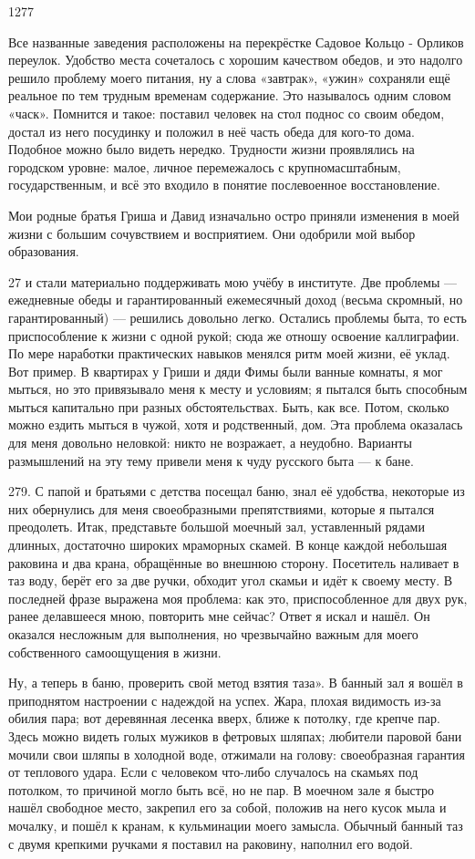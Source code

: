 1277

Все названные заведения расположены на перекрёстке Садовое Кольцо - Орликов переулок. Удобство места сочеталось с хорошим качеством обедов, и это надолго решило проблему моего питания, ну а слова «завтрак», «ужин» сохраняли ещё реальное по тем трудным временам содержание. Это называлось одним словом «часк». Помнится и такое: поставил человек на стол поднос со своим обедом, достал из него посудинку и положил в неё часть обеда для кого-то дома. Подобное можно было видеть нередко. Трудности жизни проявлялись на городском уровне: малое, личное перемежалось с крупномасштабным, государственным, и всё это входило в понятие послевоенное восстановление.

Мои родные братья Гриша и Давид изначально остро приняли изменения в моей жизни с большим сочувствием и восприятием. Они одобрили мой выбор образования.

27
и стали материально поддерживать мою учёбу в институте.
Две проблемы — ежедневные обеды и гарантированный ежемесячный доход (весьма скромный, но гарантированный) — решились довольно легко. Остались проблемы быта, то есть приспособление к жизни с одной рукой; сюда же отношу освоение каллиграфии.
По мере наработки практических навыков менялся ритм моей жизни, её уклад. Вот пример. В квартирах у Гриши и дяди Фимы были ванные комнаты, я мог мыться, но это привязывало меня к месту и условиям; я пытался быть способным мыться капитально при разных обстоятельствах. Быть, как все. Потом, сколько можно ездить мыться в чужой, хотя и родственный, дом. Эта проблема оказалась для меня довольно неловкой: никто не возражает, а неудобно. Варианты размышлений на эту тему привели меня к чуду русского быта — к бане.

279. С папой и братьями с детства посещал баню, знал её удобства, некоторые из них обернулись для меня своеобразными препятствиями, которые я пытался преодолеть. Итак, представьте большой моечный зал, уставленный рядами длинных, достаточно широких мраморных скамей. В конце каждой небольшая раковина и два крана, обращённые во внешнюю сторону. Посетитель наливает в таз воду, берёт его за две ручки, обходит угол скамьи и идёт к своему месту. В последней фразе выражена моя проблема: как это, приспособленное для двух рук, ранее делавшееся мною, повторить мне сейчас? Ответ я искал и нашёл. Он оказался несложным для выполнения, но чрезвычайно важным для моего собственного самоощущения в жизни.

Ну, а теперь в баню, проверить свой метод взятия таза». В банный зал я вошёл в приподнятом настроении с надеждой на успех. Жара, плохая видимость из-за обилия пара; вот деревянная лесенка вверх, ближе к потолку, где крепче пар. Здесь можно видеть голых мужиков в фетровых шляпах; любители паровой бани мочили свои шляпы в холодной воде, отжимали на голову: своеобразная гарантия от теплового удара. Если с человеком что-либо случалось на скамьях под потолком, то причиной могло быть всё, но не пар. В моечном зале я быстро нашёл свободное место, закрепил его за собой, положив на него кусок мыла и мочалку, и пошёл к кранам, к кульминации моего замысла. Обычный банный таз с двумя крепкими ручками я поставил на раковину, наполнил его водой.

